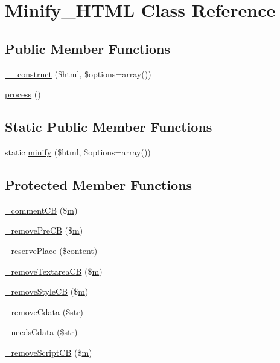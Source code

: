 \hypertarget{class_minify___h_t_m_l}{}\section{Minify\+\_\+\+H\+T\+ML Class Reference}
\label{class_minify___h_t_m_l}
\subsection*{Public Member Functions}
\begin{DoxyCompactItemize}
\item 
\hyperlink{class_minify___h_t_m_l_a9d6c4b41cafc4b0c44de4eeb3b4361bd}{\+\_\+\+\_\+construct} (\$html, \$options=array())
\item 
\hyperlink{class_minify___h_t_m_l_a7d4ad4038b036a67eece619e6f88c89e}{process} ()
\end{DoxyCompactItemize}
\subsection*{Static Public Member Functions}
\begin{DoxyCompactItemize}
\item 
static \hyperlink{class_minify___h_t_m_l_a312730bd02eca8042c4ec505fd7f1283}{minify} (\$html, \$options=array())
\end{DoxyCompactItemize}
\subsection*{Protected Member Functions}
\begin{DoxyCompactItemize}
\item 
\hyperlink{class_minify___h_t_m_l_adcc2cc65695e86d694a6b5563660264e}{\+\_\+comment\+CB} (\$\hyperlink{_chart_8min_8js_a9e77e016b2928d7dcb493b89a0c9dc32}{m})
\item 
\hyperlink{class_minify___h_t_m_l_ac9893e59df61211d88333648c3c2880c}{\+\_\+remove\+Pre\+CB} (\$\hyperlink{_chart_8min_8js_a9e77e016b2928d7dcb493b89a0c9dc32}{m})
\item 
\hyperlink{class_minify___h_t_m_l_a87e1eef7a0aab954b9e0e14819c93471}{\+\_\+reserve\+Place} (\$content)
\item 
\hyperlink{class_minify___h_t_m_l_a81514a60ec8faf04eb8bb7a61d95e868}{\+\_\+remove\+Textarea\+CB} (\$\hyperlink{_chart_8min_8js_a9e77e016b2928d7dcb493b89a0c9dc32}{m})
\item 
\hyperlink{class_minify___h_t_m_l_a13ef95cfa51603054d618cb52c52e096}{\+\_\+remove\+Style\+CB} (\$\hyperlink{_chart_8min_8js_a9e77e016b2928d7dcb493b89a0c9dc32}{m})
\item 
\hyperlink{class_minify___h_t_m_l_a876c6dbee0fbc7780daac2243bdf4233}{\+\_\+remove\+Cdata} (\$str)
\item 
\hyperlink{class_minify___h_t_m_l_ac0f5c79a940f0c5d1b60f77830238d38}{\+\_\+needs\+Cdata} (\$str)
\item 
\hyperlink{class_minify___h_t_m_l_a681d17c6a1526d7447969341ccdc3ef2}{\+\_\+remove\+Script\+CB} (\$\hyperlink{_chart_8min_8js_a9e77e016b2928d7dcb493b89a0c9dc32}{m})
\end{DoxyCompactItemize}
